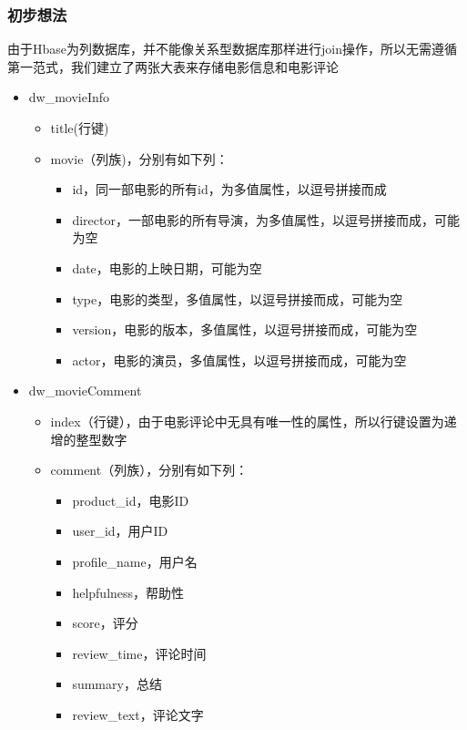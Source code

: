 \documentclass{ctexrep}
\begin{document}
	\subsubsection{初步想法}
	由于Hbase为列数据库，并不能像关系型数据库那样进行join操作，所以无需遵循第一范式，我们建立了两张大表来存储电影信息和电影评论
	\begin{itemize}
		\item dw\_movieInfo
			\begin{itemize}
				\item title(行键)
				\item movie（列族)，分别有如下列：
				\begin{itemize}
					\item id，同一部电影的所有id，为多值属性，以逗号拼接而成
					\item director，一部电影的所有导演，为多值属性，以逗号拼接而成，可能为空
					\item date，电影的上映日期，可能为空
					\item type，电影的类型，多值属性，以逗号拼接而成，可能为空
					\item version，电影的版本，多值属性，以逗号拼接而成，可能为空
					\item actor，电影的演员，多值属性，以逗号拼接而成，可能为空
				\end{itemize}
			\end{itemize}
		\item dw\_movieComment
			\begin{itemize}
				\item index（行键），由于电影评论中无具有唯一性的属性，所以行键设置为递增的整型数字
				\item comment（列族），分别有如下列：
				\begin{itemize}
					\item product\_id，电影ID
					\item user\_id，用户ID
					\item profile\_name，用户名
					\item helpfulness，帮助性
					\item score，评分
					\item review\_time，评论时间
					\item summary，总结
					\item review\_text，评论文字
				\end{itemize}
			\end{itemize}
	\end{itemize}
\end{document}
